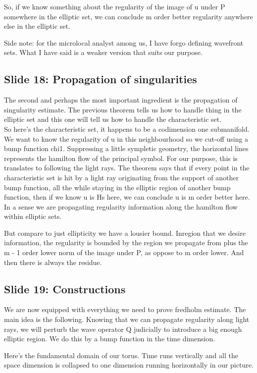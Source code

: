 \documentclass{article}
\begin{document}
So, if we know something about the regularity of the image of u under P somewhere in the elliptic set, we can conclude m order better regularity anywhere else in the elliptic set. 

Side note: for the microlocal analyst among us, I have forgo defining wavefront sets. What I have said is a weaker version that suits our purpose.


\subsection{Slide 18: Propagation of singularities }
The second and perhaps the most important ingredient is the propagation of singularity estimate. The previous theorem tells us how to handle thing in the elliptic set and this one will tell us how to handle the characteristic set. \\


So here's the characteristic set, it happens to be a codimension one submanifold. We want to know the regularity of u in this neighbourhood so we cut-off using a bump function chi1. Suppressing a little sympletic geometry, the horizontal lines represents the hamilton flow of the principal symbol. For our purpose, this is translates to following the light rays. The theorem says that if every point in the characteristic set is hit by a light ray originating from the support of another bump function, all the while staying in the elliptic region of another bump function, then if we know u is Hs here, we can conclude u is m order better here. In a sense we are propagating regularity information along the hamilton flow within elliptic sets. 

But compare to just ellipticity we have a lousier bound. Inregion that we desire information, the regularity is bounded by the region we propagate from plus the m - 1 order lower norm of the image under P, as oppose to m order lower. And then there is always the residue. 

\subsection{Slide 19: Constructions}
We are now equipped with everything we need to prove fredholm estimate. The main idea is the following. Knowing that we can propagate regularity along light rays, we will perturb the wave operator Q judicially to introduce a big enough elliptic region. We do this by a bump function in the time dimension. 

Here's the fundamental domain of our torus. Time runs vertically and all the space dimension is collapsed to one dimension running horizontally in our picture. 
\end{document}

